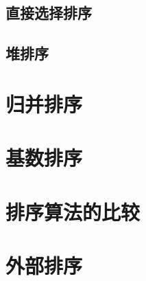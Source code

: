 \documentclass[lang=cn,newtx,10pt,scheme=chinese]{elegantbook}
\begin{document}
\subsection{直接选择排序}

\subsection{堆排序}

\section{归并排序}

\section{基数排序}

\section{排序算法的比较}

\section{外部排序}
\end{document}
